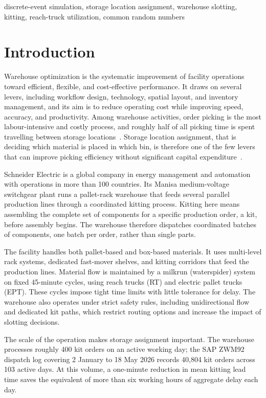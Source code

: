 \documentclass[conference]{IEEEtran}
\begin{document}
\begin{IEEEkeywords}
discrete-event simulation, storage location assignment, warehouse slotting,
kitting, reach-truck utilization, common random numbers
\end{IEEEkeywords}

\section{Introduction}
Warehouse optimization is the systematic improvement of facility operations
toward efficient, flexible, and cost-effective performance. It draws on
several levers, including workflow design, technology, spatial layout, and
inventory management, and its aim is to reduce operating cost while improving
speed, accuracy, and productivity. Among warehouse activities, order picking
is the most labour-intensive and costly process, and roughly half of all
picking time is spent travelling between storage locations~\cite{frazelle2002}.
Storage location assignment, that is deciding which material is placed in
which bin, is therefore one of the few levers that can improve picking
efficiency without significant capital expenditure~\cite{dekoster2007}.

Schneider Electric is a global company in energy management and automation
with operations in more than 100 countries. Its Manisa medium-voltage
switchgear plant runs a pallet-rack warehouse that feeds several parallel
production lines through a coordinated kitting process. Kitting here means
assembling the complete set of components for a specific production order, a
kit, before assembly begins. The warehouse therefore dispatches coordinated
batches of components, one batch per order, rather than single parts.

The facility handles both pallet-based and box-based materials. It uses
multi-level rack systems, dedicated fast-mover shelves, and kitting corridors
that feed the production lines. Material flow is maintained by a milkrun
(waterspider) system on fixed 45-minute cycles, using reach trucks (RT) and
electric pallet trucks (EPT). These cycles impose tight time limits with
little tolerance for delay. The warehouse also operates under strict safety
rules, including unidirectional flow and dedicated kit paths, which restrict
routing options and increase the impact of slotting decisions.

The scale of the operation makes storage assignment important. The warehouse
processes roughly 400 kit orders on an active working day; the SAP ZWM92
dispatch log covering 2 January to 18 May 2026 records 40{,}804 kit orders
across 103 active days. At this volume, a one-minute reduction in mean kitting
lead time saves the equivalent of more than six working hours of aggregate
delay each day.
\end{document}
